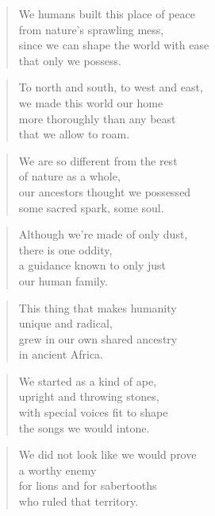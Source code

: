 \documentclass[14pt,a4paper]{article}
\begin{document}
\begin{verse}
We humans built this place of peace\\
from nature’s sprawling mess,\\
since we can shape the world with ease\\
that only we possess.
\end{verse}

\begin{verse}
To north and south, to west and east,\\
we made this world our home\\
more thoroughly than any beast\\
that we allow to roam.
\end{verse}

\begin{verse}
We are so different from the rest\\
of nature as a whole,\\
our ancestors thought we possessed\\
some sacred spark, some soul.
\end{verse}

\begin{verse}
Although we’re made of only dust,\\
there is one oddity,\\
a guidance known to only just\\
our human family.
\end{verse}

\begin{verse}
This thing that makes humanity\\
unique and radical,\\
grew in our own shared ancestry\\
in ancient Africa.
\end{verse}

\begin{verse}
We started as a kind of ape,\\
upright and throwing stones,\\
with special voices fit to shape\\
the songs we would intone.
\end{verse}

\begin{verse}
We did not look like we would prove\\
a worthy enemy\\
for lions and for sabertooths\\
who ruled that territory.
\end{verse}
\end{document}
